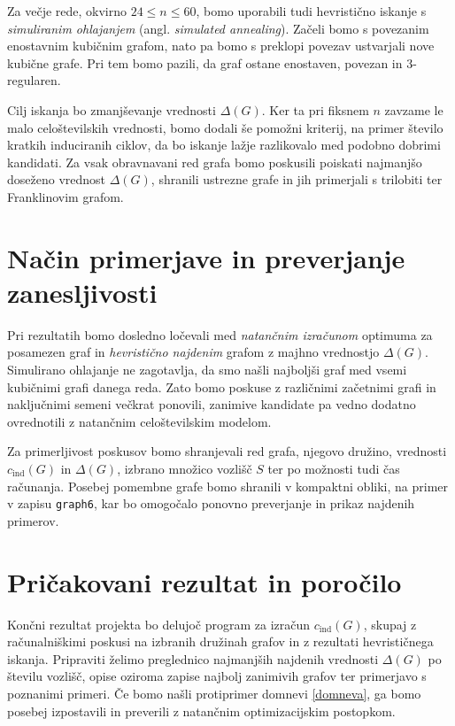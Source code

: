 \documentclass[11pt,a4paper]{article}
\begin{document}
Za večje rede, okvirno $24\leq n\leq 60$, bomo uporabili tudi hevristično iskanje s \emph{simuliranim ohlajanjem}
(angl. \emph{simulated annealing}). Začeli bomo s povezanim enostavnim kubičnim grafom, nato pa bomo s preklopi
povezav ustvarjali nove kubične grafe. Pri tem bomo pazili, da graf ostane enostaven, povezan in
3-regularen.

Cilj iskanja bo zmanjševanje vrednosti $\Delta(G)$. Ker ta pri fiksnem $n$ zavzame le malo celoštevilskih
vrednosti, bomo dodali še pomožni kriterij, na primer število kratkih induciranih ciklov, da bo
iskanje lažje razlikovalo med podobno dobrimi kandidati. Za vsak obravnavani red grafa bomo poskusili poiskati
najmanjšo doseženo vrednost $\Delta(G)$, shranili ustrezne grafe in jih primerjali s trilobiti ter Franklinovim grafom.

\section{Način primerjave in preverjanje zanesljivosti}

Pri rezultatih bomo dosledno ločevali med \emph{natančnim izračunom} optimuma za posamezen graf in \emph{hevristično najdenim}
grafom z majhno vrednostjo $\Delta(G)$. Simulirano ohlajanje ne zagotavlja, da smo našli najboljši graf med
vsemi kubičnimi grafi danega reda. Zato bomo poskuse z različnimi začetnimi grafi in naključnimi semeni
večkrat ponovili, zanimive kandidate pa vedno dodatno ovrednotili z natančnim celoštevilskim modelom.

Za primerljivost poskusov bomo shranjevali red grafa, njegovo družino, vrednosti $c_{\mathrm{ind}}(G)$ in $\Delta(G)$, izbrano množico
vozlišč $S$ ter po možnosti tudi čas računanja. Posebej pomembne grafe bomo shranili v kompaktni
obliki, na primer v zapisu \texttt{graph6}, kar bo omogočalo ponovno preverjanje in prikaz najdenih primerov.

\section{Pričakovani rezultat in poročilo}

Končni rezultat projekta bo delujoč program za izračun $c_{\mathrm{ind}}(G)$, skupaj z računalniškimi poskusi na izbranih
družinah grafov in z rezultati hevrističnega iskanja. Pripraviti želimo preglednico najmanjših najdenih vrednosti $\Delta(G)$ po
številu vozlišč, opise oziroma zapise najbolj zanimivih grafov ter primerjavo s poznanimi primeri. Če bomo
našli protiprimer domnevi \ref{domneva}, ga bomo posebej izpostavili in preverili z natančnim optimizacijskim postopkom. 

\end{document}
